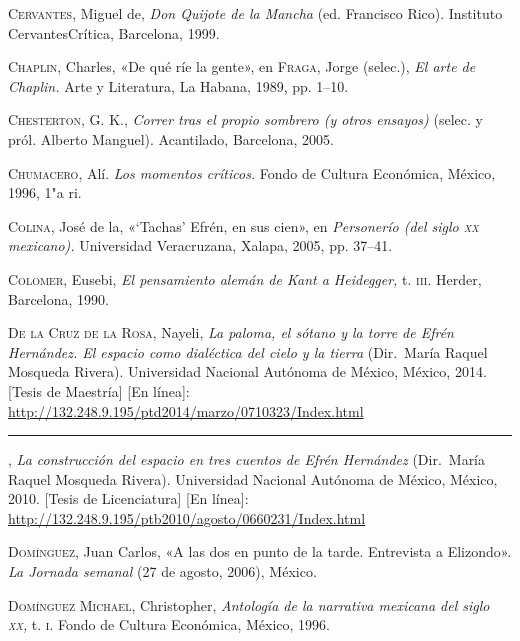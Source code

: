 \documentclass[14pt,twoside,final]{extbook} %
\begin{document}
\textsc{Cervantes}, Miguel de, \emph{Don Quijote de la Mancha} (ed. Francisco Rico). Instituto Cervantes Crítica, Barcelona, 1999.\label{bib:cervantes1999}

\textsc{Chaplin}, Charles, «De qué ríe la gente», en \textsc{Fraga}, Jorge (selec.), \emph{El arte de Chaplin.} Arte y Literatura, La Habana, 1989, pp. 1--10.\label{bib:chaplin1989}

\textsc{Chesterton}, G. K., \emph{Correr tras el propio sombrero (y otros ensayos)} (selec. y pról. Alberto Manguel). Acantilado, Barcelona, 2005.\label{bib:chesterton2005}

\textsc{Chumacero}, Alí. \emph{Los momentos críticos.} Fondo de Cultura Económica, México, 1996, 1"a ri.

\textsc{Colina}, José de la, «`Tachas' Efrén, en sus cien», en \emph{Personerío (del siglo \textsc{xx} mexicano).} Universidad Veracruzana, Xalapa, 2005, pp. 37--41.\label{bib:colina2005}

\textsc{Colomer}, Eusebi, \emph{El pensamiento alemán de Kant a Heidegger,} t. \textsc{iii}. Herder, Barcelona, 1990.\label{bib:colomer1990}

\textsc{De la Cruz de la Rosa}, Nayeli, \textit{\emph{La paloma, el sótano y la torre} de Efrén Hernández. El espacio como dialéctica del cielo y la tierra} (Dir.~María Raquel Mosqueda Rivera). Universidad Nacional Autónoma de México, México, 2014. [Tesis de Maestría] [En línea]: \url{http://132.248.9.195/ptd2014/marzo/0710323/Index.html}\label{bib:delacruz2014}

\rule{1cm}{0.4pt}, \emph{La construcción del espacio en tres cuentos de Efrén Hernández} (Dir.~María Raquel Mosqueda Rivera). Universidad Nacional Autónoma de México, México, 2010. [Tesis de Licenciatura] [En línea]: \url{http://132.248.9.195/ptb2010/agosto/0660231/Index.html}\label{bib:delacruz2010}

\textsc{Domínguez}, Juan Carlos, «A las dos en punto de la tarde. Entrevista a Elizondo». \emph{La Jornada semanal} (27 de agosto, 2006), México.\label{bib:dominguez2006}

\textsc{Domínguez Michael}, Christopher, \emph{Antología de la narrativa mexicana del siglo \textsc{xx},} t. \textsc{i}. Fondo de Cultura Económica, México, 1996.\label{bib:dominguez1996}
\end{document}
